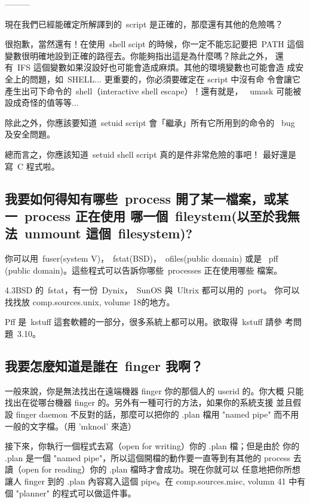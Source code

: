 \documentclass{article}
\begin{document}
\begin{CJK*}{Bg5}{ming}
        ---------

	現在我們已經能確定所解譯到的~script 是正確的，那麼還有其他的危險嗎？

	很抱歉，當然還有！在使用~shell scipt 的時候，你一定不能忘記要把~PATH 
        這個變數很明確地設到正確的路徑去。你能夠指出這是為什麼嗎？除此之外，
        還有~IFS 這個變數如果沒設好也可能會造成麻煩。其他的環境變數也可能會造
        成安全上的問題，如~SHELL... 更重要的，你必須要確定在 script 中沒有命
        令會讓它產生出可下命令的~shell（interactive shell escape）！還有就是，
       ~umask 可能被設成奇怪的值等等...

	除此之外，你應該要知道~setuid script 會「繼承」所有它所用到的命令的 
       ~bug 及安全問題。

	總而言之，你應該知道~setuid shell script 真的是件非常危險的事吧！
        最好還是寫~C 程式啦。

\subsection{我要如何得知有哪些~process 開了某一檔案，或某一~process 正在使用
      哪一個~fileystem(以至於我無法~unmount 這個~filesystem)?}

	你可以用~fuser(system V)，~fstat(BSD)，~ofiles(public domain) 或是
	~pff (public domain)。這些程式可以告訴你哪些~processes 正在使用哪些
	檔案。

	4.3BSD 的~fstat，有一份~Dynix，~SunOS 與~Ultrix 都可以用的~port。
	你可以找找放 comp.sources.unix, volume 18的地方。

	Pff 是~kstuff 這套軟體的一部分，很多系統上都可以用。欲取得~kstuff 請參
        考問題~3.10。

\subsection{我要怎麼知道是誰在~finger 我啊？}

	一般來說，你是無法找出在遠端機器 finger 你的那個人的 userid 的。你大概
        只能找出在從哪台機器 finger 的。另外有一種可行的方法，如果你的系統支援
        並且假設 finger daemon 不反對的話，那麼可以把你的 .plan 檔用 "named 
        pipe" 而不用一般的文字檔。（用 'mknod' 來造）

	接下來，你執行一個程式去寫（open for writing）你的 .plan 檔；但是由於
        你的 .plan 是一個 "named pipe"，所以這個開檔的動作要一直等到有其他的 
	process 去讀（open for reading）你的 .plan 檔時才會成功。現在你就可以
        任意地把你所想讓人 finger 到的 .plan 內容寫入這個 pipe。在 
        comp.sources.misc, volumn 41 中有個 "planner" 的程式可以做這件事。


\end{CJK*}
\end{document}
